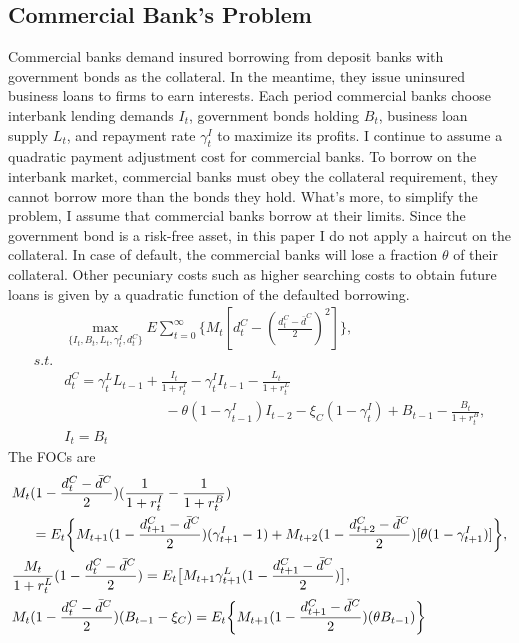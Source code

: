 \documentclass[12pt]{article}
\begin{document}
\subsection{Commercial Bank's Problem}
Commercial banks demand insured borrowing from deposit banks with government bonds as the collateral. In the meantime, they issue uninsured business loans to firms to earn interests.
Each period commercial banks choose interbank lending demands $I_t$, government bonds holding $B_t$, business loan supply $L_t$, and repayment rate $\gamma_t^I$ to maximize its profits. 
I continue to assume a quadratic payment adjustment cost for commercial banks. To borrow on the interbank market, commercial banks must obey the collateral requirement, they cannot borrow
more than the bonds they hold. What's more, to simplify the problem, I assume that commercial banks borrow at their limits. 
Since the government bond is a risk-free asset, in this paper I do not apply a haircut on the collateral.
In case of default, the commercial banks will lose a fraction $\theta$ of their collateral. Other pecuniary costs such as higher searching costs to obtain future loans is given by a quadratic function of the defaulted borrowing.
\begin{align}
  &\max_{\{I_t, B_t, L_t, \gamma_t^I, d_t^C\}} E \sum_{t=0}^{\infty} \{M_t[d_t^C-(\frac{d_t^C-\bar{d}^C}{2})^2]\} ,\\
  s.t. \nonumber \\
  &d_t^C=\gamma_t^L L_{t-1}+\frac{I_t}{1+r_t^I}-\gamma_t^I I_{t-1}-\frac{L_t}{1+r_t^L} \nonumber \\
  & \hspace{3cm}-\theta(1-\gamma_{t-1}^I)I_{t-2}-\xi_C(1-\gamma_t^I)+B_{t-1}-\frac{B_t}{1+r_t^B}, \\
  &I_t= B_t 
\end{align}
The FOCs are 
\begin{align}
  &M_t (1-\frac{d_t^C-\bar{d}^C}{2})(\frac{1}{1+r_t^I}-\frac{1}{1+r_t^B}) \nonumber \\
  & \hspace{5mm} = E_t \bigg\{ M_{t+1} (1-\frac{d_{t+1}^C-\bar{d}^C}{2})(\gamma_{t+1}^I-1)+ M_{t+2} (1-\frac{d_{t+2}^C-\bar{d}^C}{2}) [\theta(1-\gamma_{t+1}^I)] \bigg\}, \\
  &\frac{M_t}{1+r_t^L}(1-\frac{d_t^C-\bar{d}^C}{2})=E_t \big[M_{t+1} \gamma_{t+1}^L (1-\frac{d_{t+1}^C-\bar{d}^C}{2})\big], \\
  &M_t (1-\frac{d_t^C-\bar{d}^C}{2})(B_{t-1}-\xi_C)=E_t \bigg\{ M_{t+1} (1 -\frac{d_{t+1}^C-\bar{d}^C}{2})(\theta B_{t-1}) \bigg\}
\end{align}
\end{document}
